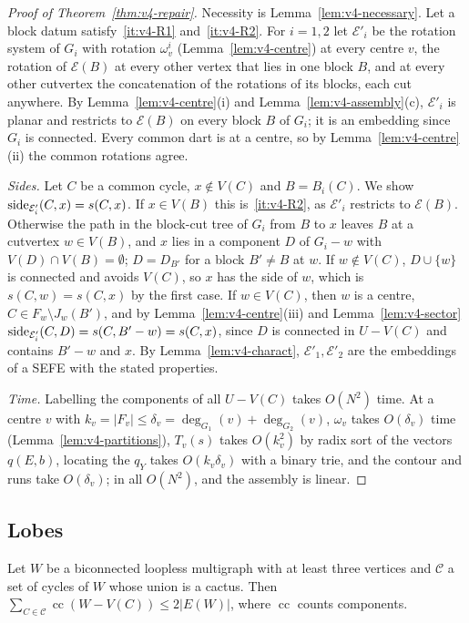\begin{proof}[Proof of Theorem~\ref{thm:v4-repair}]
Necessity is Lemma~\ref{lem:v4-necessary}. Let a block datum
satisfy~\ref{it:v4-R1} and~\ref{it:v4-R2}. For $i=1,2$ let $\mathcal E'_i$ be
the rotation system of $G_i$ with rotation $\omega^i_v$
(Lemma~\ref{lem:v4-centre}) at every centre $v$, the rotation of
$\mathcal E(B)$ at every other vertex that lies in one block $B$, and at every
other cutvertex the concatenation of the rotations of its blocks, each cut
anywhere. By Lemma~\ref{lem:v4-centre}(i) and
Lemma~\ref{lem:v4-assembly}(c), $\mathcal E'_i$ is planar and restricts to
$\mathcal E(B)$ on every block $B$ of $G_i$; it is an embedding since $G_i$
is connected. Every common dart is at a centre, so by
Lemma~\ref{lem:v4-centre}(ii) the common rotations agree.

\emph{Sides.} Let $C$ be a common cycle, $x\notin V(C)$ and $B=B_i(C)$. We
show $\operatorname{side}_{\mathcal E'_i}(C,x)=s(C,x)$. If $x\in V(B)$ this
is~\ref{it:v4-R2}, as $\mathcal E'_i$ restricts to $\mathcal E(B)$.
Otherwise the path in the block-cut tree of $G_i$ from $B$ to $x$ leaves $B$
at a cutvertex $w\in V(B)$, and $x$ lies in a component $D$ of $G_i-w$ with
$V(D)\cap V(B)=\emptyset$; $D=D_{B'}$ for a block $B'\neq B$ at $w$.
If $w\notin V(C)$, $D\cup\{w\}$ is connected and avoids $V(C)$, so $x$ has
the side of $w$, which is $s(C,w)=s(C,x)$ by the first case. If $w\in V(C)$,
then $w$ is a centre, $C\in F_w\setminus J_w(B')$, and by
Lemma~\ref{lem:v4-centre}(iii) and Lemma~\ref{lem:v4-sector}
$\operatorname{side}_{\mathcal E'_i}(C,D)=s(C,B'-w)=s(C,x)$, since $D$ is connected in
$U-V(C)$ and contains $B'-w$ and $x$. By Lemma~\ref{lem:v4-charact},
$\mathcal E'_1,\mathcal E'_2$ are the embeddings of a SEFE with the stated
properties.

\emph{Time.} Labelling the components of all $U-V(C)$ takes $O(N^2)$ time.
At a centre $v$ with $k_v=|F_v|\le\delta_v=\deg_{G_1}(v)+\deg_{G_2}(v)$,
$\omega_v$ takes $O(\delta_v)$ time (Lemma~\ref{lem:v4-partitions}),
$T_v(s)$ takes $O(k_v^2)$ by radix sort of the vectors $q(E,b)$, locating the
$q_Y$ takes $O(k_v\delta_v)$ with a binary trie, and the contour and runs
take $O(\delta_v)$; in all $O(N^2)$, and the assembly is linear.
\end{proof}

\subsection{Lobes}\label{sec:v4-lobes}

\begin{lemma}[counting]\label{lem:v4-count}
Let $W$ be a biconnected loopless multigraph with at least three vertices
and $\mathcal C$ a set of cycles of $W$ whose union is a cactus. Then
$\sum_{C\in\mathcal C}\operatorname{cc}(W-V(C))\le2|E(W)|$, where
$\operatorname{cc}$ counts components.
\end{lemma}

